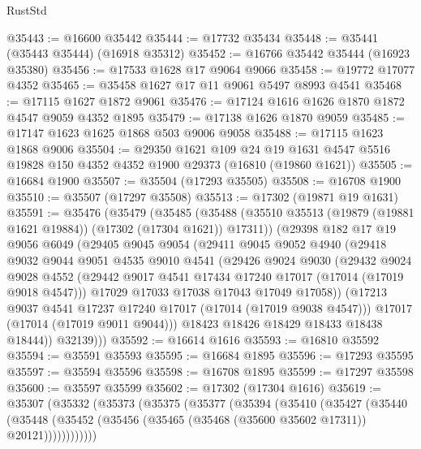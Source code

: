 \begin{lexlean}{RustStd}
\begin{coremodule}
@35443 := @16600 @35442
@35444 := @17732 @35434
@35448 := @35441 (@35443 @35444) (@16918 @35312)
@35452 := @16766 @35442 @35444 (@16923 @35380)
@35456 := @17533 @1628 @17 @9064 @9066
@35458 := @19772 @17077 @4352
@35465 := @35458 @1627 @17 @11 @9061 @5497 @8993 @4541
@35468 := @17115 @1627 @1872 @9061
@35476 := @17124 @1616 @1626 @1870 @1872 @4547 @9059 @4352 @1895
@35479 := @17138 @1626 @1870 @9059
@35485 := @17147 @1623 @1625 @1868 @503 @9006 @9058
@35488 := @17115 @1623 @1868 @9006
@35504 := @29350
    @1621
    @109
    @24
    @19
    @1631
    @4547
    @5516
    @19828
    @150
    @4352
    @4352
    @1900
    @29373
    (@16810 (@19860 @1621))
@35505 := @16684 @1900
@35507 := @35504 (@17293 @35505)
@35508 := @16708 @1900
@35510 := @35507 (@17297 @35508)
@35513 := @17302 (@19871 @19 @1631)
@35591 := @35476
    (@35479
      (@35485
        (@35488 (@35510 @35513 (@19879 (@19881 @1621 @19884)) (@17302 (@17304 @1621)) @17311))
        (@29398
          @182
          @17
          @19
          @9056
          @6049
          (@29405
            @9045
            @9054
            (@29411
              @9045
              @9052
              @4940
              (@29418
                @9032
                @9044
                @9051
                @4535
                @9010
                @4541
                (@29426
                  @9024
                  @9030
                  (@29432
                    @9024
                    @9028
                    @4552
                    (@29442 @9017 @4541 @17434 @17240 @17017 (@17014 (@17019 @9018 @4547)))
                    @17029
                    @17033
                    @17038
                    @17043
                    @17049
                    @17058))
                (@17213 @9037 @4541 @17237 @17240 @17017 (@17014 (@17019 @9038 @4547)))
                @17017
                (@17014 (@17019 @9011 @9044)))
              @18423
              @18426
              @18429
              @18433
              @18438
              @18444))
          @32139)))
@35592 := @16614 @1616
@35593 := @16810 @35592
@35594 := @35591 @35593
@35595 := @16684 @1895
@35596 := @17293 @35595
@35597 := @35594 @35596
@35598 := @16708 @1895
@35599 := @17297 @35598
@35600 := @35597 @35599
@35602 := @17302 (@17304 @1616)
@35619 := @35307
    (@35332
      (@35373
        (@35375
          (@35377
            (@35394
              (@35410
                (@35427
                  (@35440
                    (@35448
                      (@35452 (@35456 (@35465 (@35468 (@35600 @35602 @17311)) @20121))))))))))))

\end{coremodule}
\end{lexlean}
